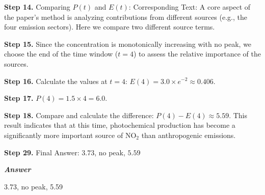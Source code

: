 \begin{tcolorbox}[
    breakable,
    title=Example of Scientific Deep Research in Earth,
    colback=LighterGray,
    colframe=DeepPurple,
    colbacktitle=DeepPurple,
    coltitle=White,
]
\textbf{\textcolor{CaseOrange}{Step 14.}} Comparing $P(t)$ and $E(t)$: Corresponding Text: A core aspect of the paper's method is analyzing contributions from different sources (e.g., the four emission sectors). Here we compare two different source terms.

\textbf{\textcolor{CaseOrange}{Step 15.}} Since the concentration is monotonically increasing with no peak, we choose the end of the time window ($t=4$) to assess the relative importance of the sources.

\textbf{\textcolor{CaseOrange}{Step 16.}} Calculate the values at $t=4$: $E(4) = 3.0 \times e^{-2} \approx 0.406$.

\textbf{\textcolor{CaseOrange}{Step 17.}} $P(4) = 1.5 \times 4 = 6.0$.

\textbf{\textcolor{CaseOrange}{Step 18.}} Compare and calculate the difference: $P(4) - E(4) \approx 5.59$. This result indicates that at this time, photochemical production has become a significantly more important source of NO$_2$ than anthropogenic emissions.

\textbf{\textcolor{CaseOrange}{Step 29.}} Final Answer: $3.73$, no peak, $5.59$

\textbf{\emph{\textcolor{DeepPurple}{Answer}}}

3.73, no peak, 5.59

\end{tcolorbox}

